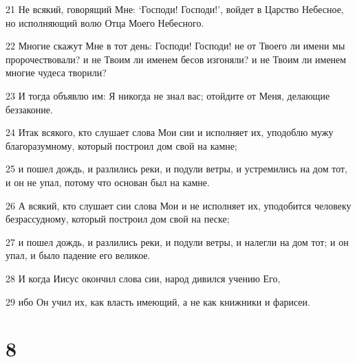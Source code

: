 \par 21 Не всякий, говорящий Мне: `Господи! Господи!', войдет в Царство Небесное, но исполняющий волю Отца Моего Небесного.
\par 22 Многие скажут Мне в тот день: Господи! Господи! не от Твоего ли имени мы пророчествовали? и не Твоим ли именем бесов изгоняли? и не Твоим ли именем многие чудеса творили?
\par 23 И тогда объявлю им: Я никогда не знал вас; отойдите от Меня, делающие беззаконие.
\par 24 Итак всякого, кто слушает слова Мои сии и исполняет их, уподоблю мужу благоразумному, который построил дом свой на камне;
\par 25 и пошел дождь, и разлились реки, и подули ветры, и устремились на дом тот, и он не упал, потому что основан был на камне.
\par 26 А всякий, кто слушает сии слова Мои и не исполняет их, уподобится человеку безрассудному, который построил дом свой на песке;
\par 27 и пошел дождь, и разлились реки, и подули ветры, и налегли на дом тот; и он упал, и было падение его великое.
\par 28 И когда Иисус окончил слова сии, народ дивился учению Его,
\par 29 ибо Он учил их, как власть имеющий, а не как книжники и фарисеи.

\chapter{8}

